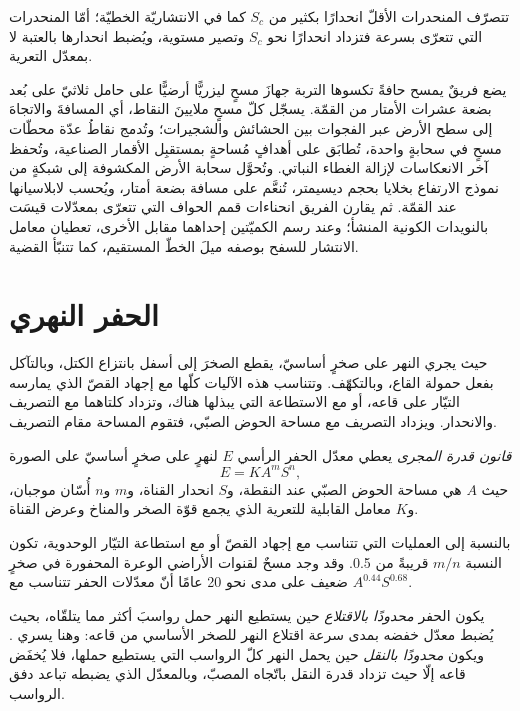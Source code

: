 تتصرّف المنحدرات الأقلّ انحدارًا بكثير من $S_c$ كما في الانتشاريّة الخطيّة؛ أمّا المنحدرات
التي تتعرّى بسرعة فتزداد انحدارًا نحو $S_c$ وتصير مستوية، ويُضبط انحدارها
بالعتبة لا بمعدّل التعرية.

\begin{inthefield}
يضع فريقٌ يمسح حافةً تكسوها التربة جهازَ مسحٍ ليزريًّا أرضيًّا على حامل ثلاثيّ
على بُعد بضعة عشرات الأمتار من القمّة. يسجّل كلّ مسحٍ ملايينَ النقاط،
أي المسافةَ والاتجاهَ إلى سطح الأرض عبر الفجوات
بين الحشائش والشجيرات؛ وتُدمج نقاطُ عدّة محطّات مسحٍ
في سحابةٍ واحدة، تُطابَق على أهدافٍ مُساحةٍ بمستقبِل الأقمار الصناعية،
وتُحفظ آخر الانعكاسات لإزالة الغطاء النباتي. وتُحوَّل سحابة الأرض المكشوفة
إلى شبكةٍ من نموذج الارتفاع بخلايا بحجم ديسيمتر، تُنعَّم على مسافة بضعة
أمتار، ويُحسب لابلاسيانها عند القمّة. ثم يقارن الفريق انحناءات
قمم الحواف التي تتعرّى بمعدّلات قيسَت بالنويدات الكونية
المنشأ؛ وعند رسم الكميّتين إحداهما مقابل الأخرى، تعطيان معامل الانتشار
للسفح بوصفه ميلَ الخطّ المستقيم، كما تتنبّأ القضية.
\end{inthefield}

\section{الحفر النهري}\label{sec:b3:quantitative-geomorphology:rivers}

حيث يجري النهر على صخرٍ أساسيّ، يقطع الصخرَ إلى أسفل بانتزاع الكتل،
وبالتآكل بفعل حمولة القاع، وبالتكهّف. وتتناسب هذه الآليات كلّها مع إجهاد القصّ
الذي يمارسه التيّار على قاعه، أو مع الاستطاعة التي يبذلها هناك،
وتزداد كلتاهما مع التصريف والانحدار. ويزداد التصريف مع مساحة الحوض الصبّي،
فتقوم المساحة مقام التصريف.

\begin{definition}\label{def:b3:quantitative-geomorphology:stream-power}
\emph{قانون قدرة المجرى} يعطي معدّل الحفر الرأسي $E$ لنهرٍ على صخرٍ أساسيّ
على الصورة
\[
E = K A^m S^n ,
\]
حيث $A$ هي مساحة الحوض الصبّي عند النقطة، و$S$ انحدار القناة،
و$m$ و$n$ أُسّان موجبان، و$K$ معامل القابلية للتعرية
الذي يجمع قوّة الصخر والمناخ وعرض القناة.
\end{definition}

بالنسبة إلى العمليات التي تتناسب مع إجهاد القصّ أو مع استطاعة التيّار الوحدوية،
تكون النسبة $m/n$ قريبةً من 0.5. وقد وجد مسحٌ لقنوات الأراضي الوعرة المحفورة في صخرٍ ضعيف
على مدى نحو 20 عامًا أنّ معدّلات الحفر تتناسب مع $A^{0.44}S^{0.68}$.

\begin{definition}\label{def:b3:quantitative-geomorphology:limited}
يكون الحفر \emph{محدودًا بالاقتلاع}
حين يستطيع النهر حمل رواسبَ أكثر مما يتلقّاه، بحيث يُضبط معدّل خفضه
بمدى سرعة اقتلاع النهر للصخر الأساسي من قاعه:
وهنا يسري . ويكون
\emph{محدودًا بالنقل} حين يحمل النهر
كلّ الرواسب التي يستطيع حملها، فلا يُخفَض قاعه إلّا حيث
تزداد قدرة النقل باتّجاه المصبّ، وبالمعدّل الذي يضبطه تباعد
دفق الرواسب.
\end{definition}

